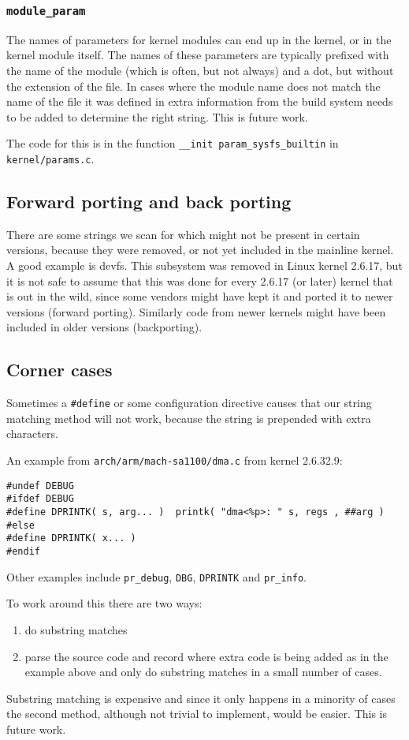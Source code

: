 \documentclass[10pt]{article}
\begin{document}
\subsubsection{\texttt{module\_param}}

The names of parameters for kernel modules can end up in the kernel, or in the
kernel module itself. The names of these parameters are typically prefixed
with the name of the module (which is often, but not always) and a dot, but
without the extension of the file. In cases where the module name does not
match the name of the file it was defined in extra information from the
build system needs to be added to determine the right string. This is future
work.

The code for this is in the function \texttt{\_\_init param\_sysfs\_builtin} in
\texttt{kernel/params.c}.

\subsection{Forward porting and back porting}

There are some strings we scan for which might not be present in certain
versions, because they were removed, or not yet included in the mainline
kernel. A good example is devfs. This subsystem was removed in Linux kernel
2.6.17, but it is not safe to assume that this was done for every 2.6.17 (or
later) kernel that is out in the wild, since some vendors might have kept it
and ported it to newer versions (forward porting). Similarly code from newer
kernels might have been included in older versions
(backporting).

\subsection{Corner cases}

Sometimes a \texttt{\#define} or some configuration directive causes that our 
string matching method will not work, because the string is prepended with
extra characters.

An example from \texttt{arch/arm/mach-sa1100/dma.c} from kernel 2.6.32.9:

\begin{verbatim}
#undef DEBUG
#ifdef DEBUG
#define DPRINTK( s, arg... )  printk( "dma<%p>: " s, regs , ##arg )
#else
#define DPRINTK( x... )
#endif
\end{verbatim}

Other examples include \texttt{pr\_debug}, \texttt{DBG}, \texttt{DPRINTK} and
\texttt{pr\_info}.

To work around this there are two ways:

\begin{enumerate}
\item do substring matches
\item parse the source code and record where extra code is being added as in
the example above and only do substring matches in a small number of cases.
\end{enumerate}

Substring matching is expensive and since it only happens in a minority of
cases the second method, although not trivial to implement, would be easier.
This is future work.
\end{document}
